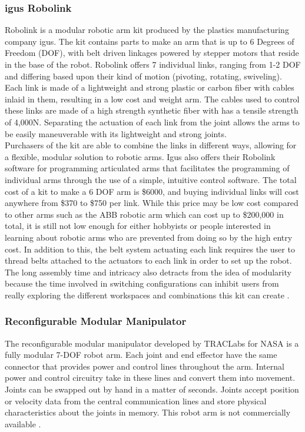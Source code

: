 \subsubsection{igus Robolink} 
Robolink is a modular robotic arm kit produced by the plastics manufacturing company igus.  The kit contains parts to make an arm that is up to 6 Degrees of Freedom (DOF), with belt driven linkages powered by stepper motors that reside in the base of the robot.  Robolink offers 7 individual links, ranging from 1-2 DOF and differing based upon their kind of motion (pivoting, rotating, swiveling).  Each link is made of a lightweight and strong plastic or carbon fiber with cables inlaid in them, resulting in a low cost and weight arm.  The cables used to control these links are made of a high strength synthetic fiber with has a tensile strength of 4,000N.  Separating the actuation of each link from the joint allows the arms to be easily maneuverable with its lightweight and strong joints.  \\
\newline
Purchasers of the kit are able to combine the links in different ways, allowing for a flexible, modular solution to robotic arms. Igus also offers their Robolink software for programming articulated arms that facilitates the programming of individual arms through the use of a simple, intuitive control software. The total cost of a kit to make a 6 DOF arm is \$6000, and buying individual links will cost anywhere from \$370 to \$750 per link. While this price may be low cost compared to other arms such as the ABB robotic arm which can cost up to \$200,000 in total, it is still not low enough for either hobbyists or people interested in learning about robotic arms who are prevented from doing so by the high entry cost. In addition to this, the belt system actuating each link requires the user to thread belts attached to the actuators to each link in order to set up the robot. The long assembly time and intricacy also detracts from the idea of modularity because the time involved in switching configurations can inhibit users from really exploring the different workspaces and combinations this kit can create \cite{igus}.  

\subsubsection{Reconfigurable Modular Manipulator}
The reconfigurable modular manipulator developed by TRACLabs for NASA is a fully modular 7-DOF robot arm. Each joint and end effector have the same connector that provides power and control lines throughout the arm. Internal power and control circuitry take in these lines and convert them into movement. Joints can be swapped out by hand in a matter of seconds. Joints accept position or velocity data from the central communication lines and store physical characteristics about the joints in memory. This robot arm is not commercially available \cite{RMM}.

